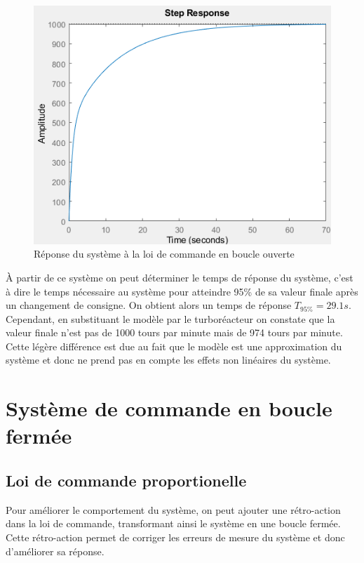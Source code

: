 \documentclass[12pt]{report}
\begin{document}
\begin{figure}[!h]
  \centering
  \includegraphics[scale=0.7]{fig/open_loop_response.png}
  \caption{Réponse du système à la loi de commande en boucle ouverte}
\end{figure}

À partir de ce système on peut déterminer le temps de réponse du système, 
c'est à dire le temps nécessaire au système pour atteindre 95\% de sa valeur finale
après un changement de consigne. On obtient alors un temps de réponse $T_{95\%} = 29.1s$.
Cependant, en substituant le modèle par le turboréacteur on constate que la 
valeur finale n'est pas de 1000 tours par minute mais de 974 tours par minute.
Cette légère différence est due au fait que le modèle est une approximation
du système et donc ne prend pas en compte les effets non linéaires du système.

\section{Système de commande en boucle fermée}

\subsection{Loi de commande proportionelle}

Pour améliorer le comportement du système, on peut ajouter une rétro-action dans la
loi de commande, transformant ainsi le système en une boucle fermée. Cette rétro-action
permet de corriger les erreurs de mesure du système et donc d'améliorer sa réponse.
\end{document}
